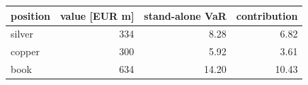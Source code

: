 \begin{tabular}{lrrr}
\toprule
position & value [EUR m] & stand-alone VaR & contribution \\
\midrule
silver & 334 & 8.28 & 6.82 \\
copper & 300 & 5.92 & 3.61 \\
\midrule book & 634 & 14.20 & 10.43 \\
\bottomrule
\end{tabular}
